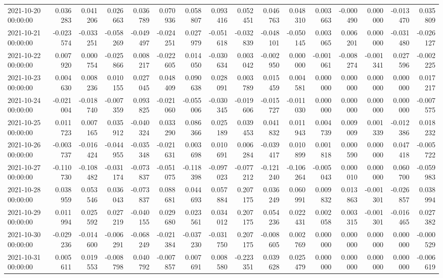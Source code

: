 \begin{tabular}{lrrrrrrrrrrrrrrr}
2021-10-20 00:00:00 & 0.036283 & 0.041206 & 0.026663 & 0.036789 & 0.070936 & 0.058807 & 0.093416 & 0.052451 & 0.046763 & 0.048310 & 0.003663 & -0.000490 & 0.000000 & -0.013470 & 0.035809 \\
2021-10-21 00:00:00 & -0.023574 & -0.033251 & -0.058269 & -0.049497 & -0.024251 & 0.027979 & -0.051618 & -0.032839 & -0.048101 & -0.050145 & 0.003065 & 0.006201 & 0.000000 & -0.031480 & -0.026127 \\
2021-10-22 00:00:00 & 0.007920 & 0.000754 & -0.025866 & 0.008217 & -0.022605 & 0.014050 & -0.030634 & 0.003042 & -0.002950 & 0.000000 & -0.001061 & -0.008274 & -0.001341 & 0.027596 & -0.002225 \\
2021-10-23 00:00:00 & 0.004630 & 0.008236 & 0.010155 & 0.027045 & 0.048409 & 0.090638 & 0.028091 & 0.003789 & 0.015459 & 0.004581 & 0.000000 & 0.000000 & 0.000000 & 0.000000 & 0.017217 \\
2021-10-24 00:00:00 & -0.021004 & -0.018740 & -0.007359 & 0.093825 & -0.021060 & -0.055006 & -0.030345 & -0.019606 & -0.015727 & -0.011030 & 0.000000 & 0.000000 & 0.000000 & 0.000000 & -0.007575 \\
2021-10-25 00:00:00 & 0.011723 & 0.007165 & 0.035912 & -0.040324 & 0.033290 & 0.086366 & 0.025189 & 0.039453 & 0.041832 & 0.011943 & 0.004739 & 0.009009 & 0.001339 & -0.012386 & 0.018232 \\
2021-10-26 00:00:00 & -0.003737 & -0.016424 & -0.044955 & -0.035348 & -0.021631 & 0.003698 & 0.010691 & 0.006284 & -0.039417 & 0.010899 & 0.001818 & 0.000590 & 0.000000 & 0.047418 & -0.005722 \\
2021-10-27 00:00:00 & -0.110730 & -0.108482 & -0.031174 & -0.073837 & -0.051075 & -0.118398 & -0.097023 & -0.077212 & -0.121240 & -0.106264 & -0.005043 & 0.000010 & 0.000000 & 0.060700 & -0.059983 \\
2021-10-28 00:00:00 & 0.038959 & 0.053546 & 0.036043 & -0.073837 & 0.088681 & 0.044693 & 0.057884 & 0.207175 & 0.036249 & 0.060991 & 0.009832 & 0.013863 & -0.001301 & -0.026857 & 0.038994 \\
2021-10-29 00:00:00 & 0.011994 & 0.025592 & 0.027219 & -0.040155 & 0.029680 & 0.023561 & 0.034012 & 0.207175 & 0.054236 & 0.022431 & 0.002058 & 0.003315 & -0.001301 & -0.016465 & 0.027382 \\
2021-10-30 00:00:00 & -0.029236 & -0.014600 & -0.006291 & -0.068249 & -0.021384 & -0.037230 & -0.031750 & 0.207175 & -0.008605 & 0.002769 & 0.000000 & 0.000000 & 0.000000 & 0.000000 & -0.000529 \\
2021-10-31 00:00:00 & 0.005611 & 0.019553 & -0.008798 & 0.040792 & -0.007857 & 0.007691 & 0.008580 & -0.223351 & 0.039628 & 0.025479 & 0.000000 & 0.000000 & 0.000000 & 0.000000 & -0.006619 \\

\end{tabular}
